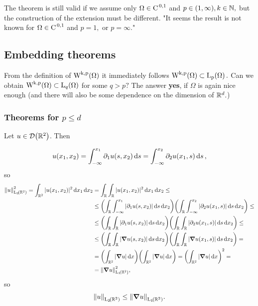 \documentclass{article}
\begin{document}
\begin{remark}
	The theorem is still valid if we assume only $\Omega \in \text{C}^{\!\,\, 0,1}$ and $p \in (1,\infty), k \in {\mathbb N},$ but the construction of the extension must be different. "It seems the result is not known for $\Omega \in \text{C}^{\!\,\, 0,1}$ and $p = 1,$ or $p = \infty.$"
\end{remark}

\subsection{Embedding theorems}
\label{sec:embedding}

From the definition of $\WkpSet{\Omega}$ it immediately follows $\WkpSet{\Omega} \subset \LpSet{\Omega}.$ Can we obtain $\WkpSet{\Omega} \subset \LpSet[q]{\Omega}$ for some $q > p?$ The answer \textbf{yes}, if $\Omega$ is again nice enough (and there will also be some dependence on the dimension of ${\mathbb R}^{d}.$)

\subsubsection{Theorems for $p \leq d$}
\label{sec:embedding_p_leq_q}

\begin{example}
	Let $u \in \mathcal{D}\qty({\mathbb R}^2)$. Then 

	\begin{equation*}
		u\qty(x_1,x_2) = \int_{-\infty}^{x_1} \partial_{1}u\qty(s,x_2)\dd{s} = \int_{-\infty}^{x_2} \partial_{2}u(x_1,s)\dd{s},
	\end{equation*}
	so 
	\begin{align*}
		\norm{u}_{\LpSet[2]{\R^{2}}}^{2} = \int_{\R^2}|u(x_1,x_2)|^{2}\dd{x_1} \dd{x_2} &= \int_{\R}\int_{\R}|u(x_1,x_2)|^{2}\dd{x_1}\dd{x_2}\leq \\
		&\leq \qty(\int_{\R}\int_{-\infty}^{x_1}|\partial_{1}u(s,x_2)|\dd{s}\dd{x_2}) \qty(\int_{\R}\int_{-\infty}^{x_2}|\partial_{2} u(x_1,s)|\dd{s}\dd{x_2}) \leq \\
		&\leq \qty(\int_{\R}\int_{\R}|\partial_{1}u(s,x_2)|\dd{s}\dd{x_2})\qty(\int_{\R}\int_{\R}|\partial_{2}u(x_1,s)|\dd{s}\dd{x_2}) \leq \\
		& \leq \qty(\int_{\R}\int_{\R}|\grad u(s,x_2)|\dd{s}\dd{x_2})\qty(\int_{\R}\int_{\R}|\grad u(x_1,s)|\dd{s}\dd{x_2}) = \\
		& = \qty(\int_{\R^2}|\grad u|\dd{x}) \qty(\int_{\R^{2}}|\grad u|\dd{x}) = \qty(\int_{\R^{2}}|\grad u|\dd{x})^{2} = \\
		& = \norm{\grad u}_{\LpSet[1]{\R^{2}}}^{2},
	\end{align*}
	so
	\[
		\norm{u}_{\LpSet[2]{\R^{2}}} \leq \norm{\grad u}_{\LpSet[1]{\R^{2}}}.
	\]
\end{example}
\end{document}
